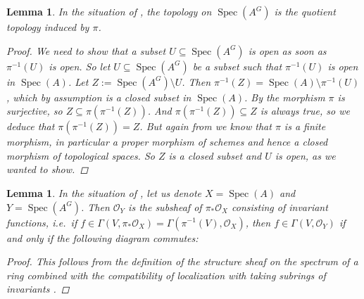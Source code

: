 \documentclass[12pt,a4paper]{amsart}
\theoremstyle{plain}
\newtheorem{lm}[thm]{Lemma}
\theoremstyle{definition}
\theoremstyle{remark}
\begin{document}
\begin{lm}\label{lm:topology}
  In the situation of , the topology on $\operatorname{Spec}(A^{G})$ is the quotient topology induced by $\pi$.
  
  \begin{proof}
    We need to show that a subset $U \subseteq \operatorname{Spec}(A^{G})$ is open as soon as $\pi^{-1}(U)$ is open.
    So let $U \subseteq \operatorname{Spec}(A^{G})$ be a subset such that $\pi^{-1}(U)$ is open in $\operatorname{Spec}(A)$.
    Let $Z := \operatorname{Spec}(A^{G}) \setminus U$.
    Then $\pi^{-1}(Z) = \operatorname{Spec}(A) \setminus \pi^{-1}(U)$, which by assumption is a closed subset in $\operatorname{Spec}(A)$.
    By  the morphism $\pi$ is surjective, so $Z \subseteq \pi(\pi^{-1}(Z))$.
    And $\pi(\pi^{-1}(Z)) \subseteq Z$ is always true, so we deduce that $\pi(\pi^{-1}(Z)) = Z$.
    But again from  we know that $\pi$ is a finite morphism, in particular a proper morphism of schemes and hence a closed morphism of topological spaces.
    So $Z$ is a closed subset and $U$ is open, as we wanted to show.
  \end{proof}
\end{lm}

\begin{lm}\label{lm:invariantslocalization}
  In the situation of , let us denote $X = \operatorname{Spec}(A)$ and $Y = \operatorname{Spec}(A^{G})$.
  Then $\mathscr{O}_{Y}$ is the subsheaf of $\pi_{*}\mathscr{O}_{X}$ consisting of invariant functions, i.e.~if $f \in \Gamma(V,\pi_{*}\mathscr{O}_{X}) = \Gamma(\pi^{-1}(V),\mathscr{O}_{X})$, then $f \in \Gamma(V, \mathscr{O}_{Y})$ if and only if the following diagram commutes:
  
  \begin{center}
  \end{center}

  \begin{proof}
    This follows from the definition of the structure sheaf on the spectrum of a ring combined with the compatibility of localization with taking subrings of invariants \cite[Exercise 5.12]{am69}.
  \end{proof}

\end{lm}
\end{document}
